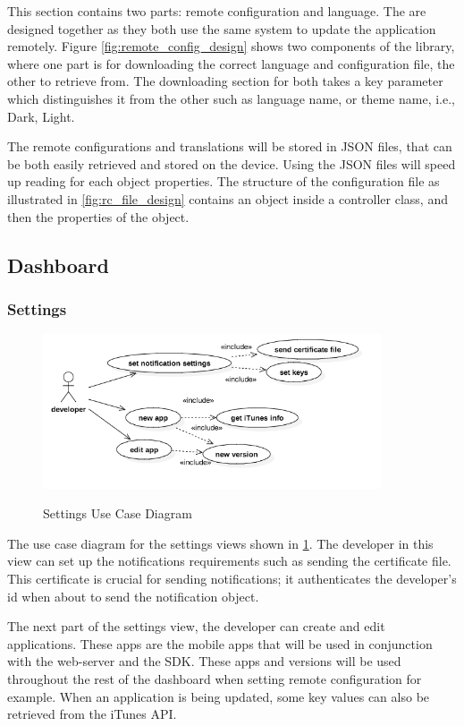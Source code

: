 This section contains two parts: remote configuration and language. The are designed together as they both use the same system to update the application remotely. Figure \ref{fig:remote_config_design} shows two components of the library, where one part is for downloading the correct language and configuration file, the other to retrieve from. The downloading section for both takes a key parameter which distinguishes it from the other such as language name, or theme name, i.e., Dark, Light.  

The remote configurations and translations will be stored in JSON files, that can be both easily retrieved and stored on the device. Using the JSON files will speed up reading for each object properties. The structure of the configuration file as illustrated in \ref{fig:rc_file_design} contains an object inside a controller class, and then the properties of the object.

\subsection{Dashboard}

\subsubsection{Settings} \label{d-db:settings}

\begin{figure}[!h]
    \caption{Settings Use Case Diagram}
    \centering
    \includegraphics[width=100mm]{images/use_cases/settings_uc}
    \label{fig:settings_uc}
\end{figure}

The use case diagram for the settings views shown in \ref{fig:settings_uc}. The developer in this view can set up the notifications requirements such as sending the certificate file. This certificate is crucial for sending notifications; it authenticates the developer's id when about to send the notification object.

The next part of the settings view, the developer can create and edit applications. These apps are the mobile apps that will be used in conjunction with the web-server and the SDK. These apps and versions will be used throughout the rest of the dashboard when setting remote configuration for example. When an application is being updated, some key values can also be retrieved from the iTunes API.

